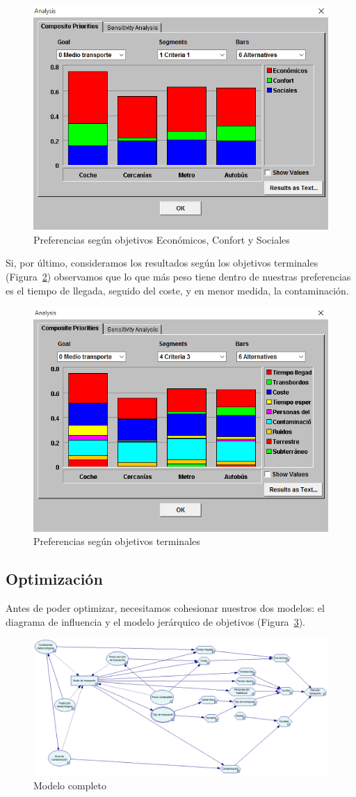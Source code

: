 \documentclass[12pt,a4paper,twoside,openright,titlepage,final]{article}
\begin{document}
\begin{figure}[htbp!]
\centering
\includegraphics[width=0.5\linewidth]{imagenes/analisis_1}
\caption{Preferencias según objetivos Económicos, Confort y Sociales} \label{fig:analisis_1}
\end{figure}

Si, por último, consideramos los resultados según los objetivos terminales (Figura~\ref{fig:analisis_2}) observamos que lo que más peso tiene dentro de nuestras preferencias es el tiempo de llegada, seguido del coste, y en menor medida, la contaminación.\\

\begin{figure}[htbp!]
\centering
\includegraphics[width=0.5\linewidth]{imagenes/analisis_2}
\caption{Preferencias según objetivos terminales} \label{fig:analisis_2}
\end{figure}

\subsection{Optimización}

Antes de poder optimizar, necesitamos cohesionar nuestros dos modelos: el diagrama de influencia y el modelo jerárquico de objetivos (Figura~\ref{fig:diagrama_influencia_completo}).\\

\begin{figure}[htbp!]
\centering
\includegraphics[width=\linewidth]{imagenes/diagrama_influencia_completo}
\caption{Modelo completo} \label{fig:diagrama_influencia_completo}
\end{figure}
\end{document}
